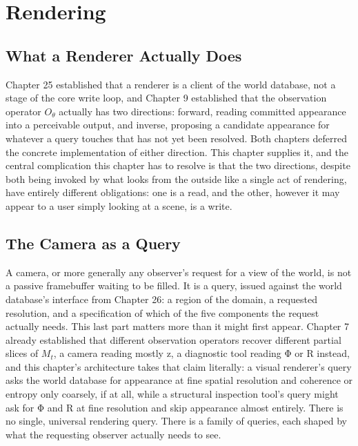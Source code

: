 \chapter{Rendering}

\section{What a Renderer Actually Does}

Chapter 25 established that a renderer is a client of the world database, not a stage of the core write loop, and Chapter 9 established that the observation operator \(O_\theta\) actually has two directions: forward, reading committed appearance into a perceivable output, and inverse, proposing a candidate appearance for whatever a query touches that has not yet been resolved. Both chapters deferred the concrete implementation of either direction. This chapter supplies it, and the central complication this chapter has to resolve is that the two directions, despite both being invoked by what looks from the outside like a single act of rendering, have entirely different obligations: one is a read, and the other, however it may appear to a user simply looking at a scene, is a write.

\section{The Camera as a Query}

A camera, or more generally any observer's request for a view of the world, is not a passive framebuffer waiting to be filled. It is a query, issued against the world database's interface from Chapter 26: a region of the domain, a requested resolution, and a specification of which of the five components the request actually needs. This last part matters more than it might first appear. Chapter 7 already established that different observation operators recover different partial slices of \(M_t\), a camera reading mostly z, a diagnostic tool reading Φ or R instead, and this chapter's architecture takes that claim literally: a visual renderer's query asks the world database for appearance at fine spatial resolution and coherence or entropy only coarsely, if at all, while a structural inspection tool's query might ask for Φ and R at fine resolution and skip appearance almost entirely. There is no single, universal rendering query. There is a family of queries, each shaped by what the requesting observer actually needs to see.

